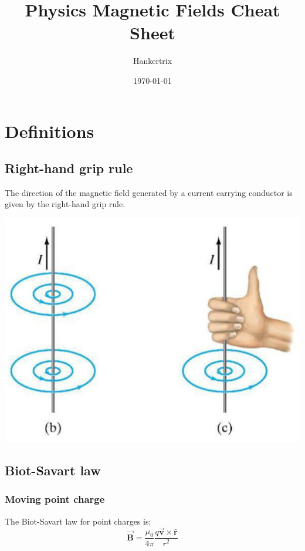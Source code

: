 \documentclass[11pt]{article}
\author{Hankertrix}
\date{\today}
\title{Physics Magnetic Fields Cheat Sheet}
\begin{document}
\maketitle
\setcounter{tocdepth}{2}
\tableofcontents \clearpage
\section{Definitions}
\label{sec:org036dd9a}

\subsection{Right-hand grip rule}
\label{sec:orge9583e0}
The direction of the magnetic field generated by a current carrying conductor is given by the right-hand grip rule.

\begin{center}
\includegraphics[scale=0.15]{./images/right-hand-grip-rule.png}
\end{center}

\subsection{Biot-Savart law}
\label{sec:org58793d4}

\subsubsection{Moving point charge}
\label{sec:org0758889}
The Biot-Savart law for point charges is:
\[\vec{\boldsymbol{B}} = \frac{\mu_0}{4 \pi} \frac{q \vec{\boldsymbol{v}} \times \hat{\boldsymbol{r}}}{r^2}\]
\end{document}
